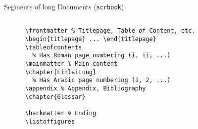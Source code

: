 \begin{frame}[fragile]{Segments of long Documents (\lstinline-scrbook-)}
  \begin{lstlisting}[gobble=4]
    
      \frontmatter % Titlepage, Table of Content, etc.
      \begin{titlepage} ... \end{titlepage}
      \tableofcontents
	  	% Has Roman page numbering (i, ii, ...)
      \mainmatter % Main content
      \chapter{Einleitung}
		% Has Arabic page numbering (1, 2, ...)
      \appendix % Appendix, Bibliography
      \chapter{Glossar}
      
      \backmatter % Ending
      \listoffigures
    
  \end{lstlisting}
\end{frame}

